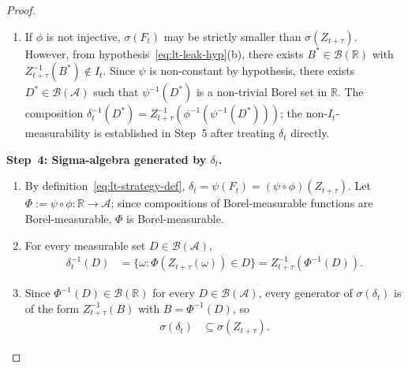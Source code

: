 \documentclass[12pt,openany]{book}
\newcommand{\calI}{\mathcal{I}}
\numberwithin{equation}{chapter}
\theoremstyle{plain}
\theoremstyle{definition}
\theoremstyle{remark}
\numberwithin{equation}{chapter}
\theoremstyle{plain}
\def\calI{I}%
\begin{document}
\begin{proof}
\begin{enumerate}
  \item If $\phi$ is not injective, $\sigma(F_t)$ may be strictly
        smaller than $\sigma(Z_{t+\tau})$.  However, from
        hypothesis~\eqref{eq:lt-leak-hyp}(b), there exists
        $B^* \in \mathcal{B}(\mathbb{R})$ with
        $Z_{t+\tau}^{-1}(B^*) \notin \calI_t$.  Since $\psi$ is
        non-constant by hypothesis, there exists
        $D^* \in \mathcal{B}(\mathcal{A})$ such that
        $\psi^{-1}(D^*)$ is a non-trivial Borel set in
        $\mathbb{R}$.  The composition
        $\delta_t^{-1}(D^*) = Z_{t+\tau}^{-1}(\phi^{-1}(\psi^{-1}(D^*)))$;
        the non-$\calI_t$-measurability is established in Step~5
        after treating $\delta_t$ directly.
\end{enumerate}

\medskip
\noindent\textbf{Step~4: Sigma-algebra generated by $\delta_t$.}
\begin{enumerate}
  \item By definition~\eqref{eq:lt-strategy-def},
        $\delta_t = \psi(F_t) = (\psi \circ \phi)(Z_{t+\tau})$.
        Let $\Phi := \psi \circ \phi : \mathbb{R} \to \mathcal{A}$;
        since compositions of Borel-measurable functions are
        Borel-measurable, $\Phi$ is Borel-measurable.
  \item For every measurable set
        $D \in \mathcal{B}(\mathcal{A})$,
        \begin{align}
          \delta_t^{-1}(D)
            &= \{\omega : \Phi(Z_{t+\tau}(\omega)) \in D\}
             = Z_{t+\tau}^{-1}(\Phi^{-1}(D)).
          \label{eq:lt-delta-preimage}
        \end{align}
  \item Since $\Phi^{-1}(D) \in \mathcal{B}(\mathbb{R})$ for
        every $D \in \mathcal{B}(\mathcal{A})$, every generator
        of $\sigma(\delta_t)$ is of the form
        $Z_{t+\tau}^{-1}(B)$ with $B = \Phi^{-1}(D)$, so
        \begin{align}
          \sigma(\delta_t) &\subseteq \sigma(Z_{t+\tau}).
          \label{eq:lt-delta-sigma-sub}
        \end{align}
\end{enumerate}


\end{proof}
\end{document}
